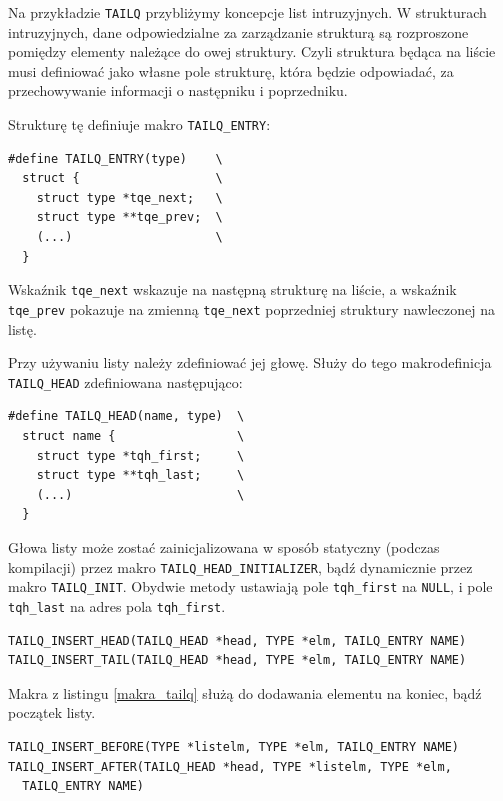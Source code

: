 \documentclass[shortabstract,inz]{iithesis}
\begin{document}
Na przykładzie \texttt{TAILQ} przybliżymy koncepcje list intruzyjnych.
W strukturach intruzyjnych, dane odpowiedzialne za zarządzanie strukturą są rozproszone
pomiędzy elementy należące do owej struktury.
Czyli struktura będąca na liście musi definiować jako własne pole strukturę, która będzie odpowiadać, za przechowywanie informacji o 
następniku i poprzedniku. 

Strukturę tę definiuje makro \texttt{TAILQ\_ENTRY}:

\begin{lstlisting}
#define TAILQ_ENTRY(type)    \
  struct {                   \
    struct type *tqe_next;   \
    struct type **tqe_prev;  \
    (...)                    \
  }
\end{lstlisting}

Wskaźnik \texttt{tqe\_next} wskazuje na następną strukturę na liście, a wskaźnik
\texttt{tqe\_prev} pokazuje na zmienną \texttt{tqe\_next} poprzedniej struktury
nawleczonej na listę.

Przy używaniu listy należy zdefiniować jej głowę. Służy do tego makrodefinicja
\texttt{TAILQ\_HEAD} zdefiniowana następująco:

\begin{lstlisting}
#define TAILQ_HEAD(name, type)  \
  struct name {                 \
    struct type *tqh_first;     \
    struct type **tqh_last;     \
    (...)                       \
  }
\end{lstlisting}

Głowa listy może zostać zainicjalizowana w sposób statyczny (podczas kompilacji) przez makro
\texttt{TAILQ\_HEAD\_INITIALIZER}, bądź dynamicznie przez makro \texttt{TAILQ\_INIT}.
Obydwie metody ustawiają pole \texttt{tqh\_first} na \texttt{NULL}, i pole \texttt{tqh\_last}
na adres pola \texttt{tqh\_first}.


\begin{lstlisting}[caption={Wstawianie do listy},label={makra_tailq}]
TAILQ_INSERT_HEAD(TAILQ_HEAD *head, TYPE *elm, TAILQ_ENTRY NAME)
TAILQ_INSERT_TAIL(TAILQ_HEAD *head, TYPE *elm, TAILQ_ENTRY NAME)
\end{lstlisting}

Makra z listingu \ref{makra_tailq} służą do dodawania elementu na koniec, bądź początek listy. 

\begin{lstlisting}[caption={Wstawianie do listy},label={makra_tailq2}]
TAILQ_INSERT_BEFORE(TYPE *listelm, TYPE *elm, TAILQ_ENTRY NAME)
TAILQ_INSERT_AFTER(TAILQ_HEAD *head, TYPE *listelm, TYPE *elm, 
  TAILQ_ENTRY NAME)
\end{lstlisting}
\end{document}
